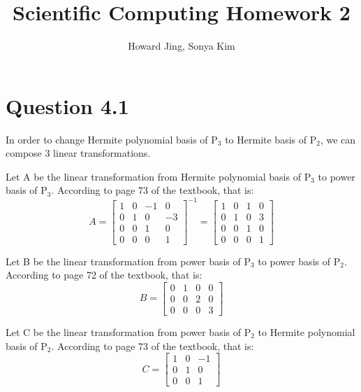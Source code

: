 \documentclass[11pt]{amsart}
\title{Scientific Computing Homework 2}
\author{Howard Jing, Sonya Kim}
\begin{document}
\maketitle
\section*{Question 4.1}
In order to change Hermite polynomial basis of P$_{3}$ to Hermite basis of P$_{2}$, we can compose 3 linear transformations.

Let A be the linear transformation from Hermite polynomial basis of P$_{3}$ to power basis of P$_{3}$. According to page 73 of the textbook, that is:
 \[
A = \begin{bmatrix}
1 & 0 & -1& 0 \\
0 & 1 & 0 & -3 \\
0 & 0 & 1 & 0 \\
0 & 0 & 0 & 1
\end{bmatrix}^{-1}  = 
\begin{bmatrix}
1 & 0 & 1& 0 \\
0 & 1 & 0 & 3 \\
0 & 0 & 1 & 0 \\
0 & 0 & 0 & 1
\end{bmatrix}
\]

Let B be the linear transformation from power basis of P$_{3}$ to power basis of P$_{2}$. According to page 72 of the textbook, that is:
\[
B = \begin{bmatrix}
0 & 1 & 0& 0 \\
0 & 0 & 2 & 0 \\
0 & 0 & 0 & 3 
\end{bmatrix}
\]

Let C be the linear transformation from power basis of P$_{2}$ to Hermite polynomial basis of  P$_{2}$. According to page 73 of the textbook, that is:
\[
C = \begin{bmatrix}
1 & 0 & -1 \\
0 & 1 & 0 \\
0 & 0 & 1
\end{bmatrix}
\]
\end{document}

